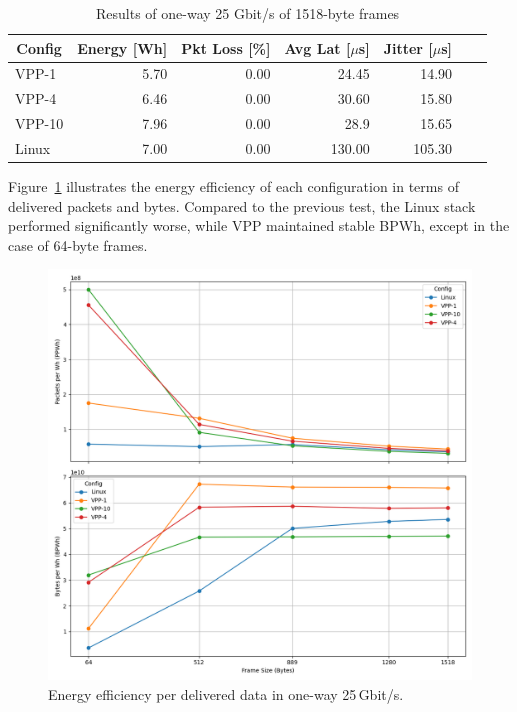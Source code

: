 \begin{table}[h!]
\centering
\caption{Results of one-way 25 Gbit/s of 1518-byte frames}
\begin{tabular}{|l|r|r|r|r|r|r|}
\hline
\multicolumn{1}{|c|}{\textbf{Config}} &
\multicolumn{1}{c|}{\textbf{Energy [Wh] }} &
\multicolumn{1}{c|}{\textbf{Pkt Loss [\%]}} &
\multicolumn{1}{c|}{\textbf{Avg Lat [$\mu$s]}} &
\multicolumn{1}{c|}{\textbf{Jitter [$\mu$s]}} \\
\hline 
VPP-1 & 5.70 & 0.00 & 24.45 & 14.90 \\
VPP-4 & 6.46 & 0.00 & 30.60 & 15.80 \\
VPP-10 & 7.96 & 0.00 & 28.9 & 15.65 \\
Linux & 7.00  & 0.00 & 130.00 & 105.30 \\
\hline
\end{tabular}
\label{tab:25udp:1518B}
\end{table}


Figure~\ref{fig:25g} illustrates the energy efficiency of each configuration in terms of delivered packets and bytes.
Compared to the previous test, the Linux stack performed significantly worse, while VPP maintained stable BPWh, except in the case of 64-byte frames.

\begin{figure}[!htbp]
    \centering
    \includegraphics[width=\linewidth]{images/consumption-25g.png}
    \caption{Energy efficiency per delivered data in one-way 25\,Gbit/s.}
    \label{fig:25g}
\end{figure}


